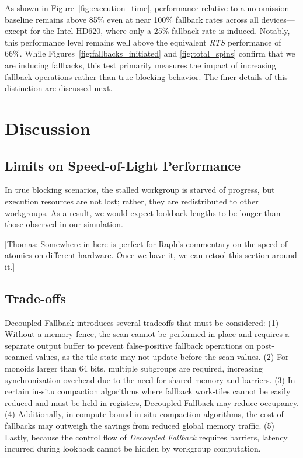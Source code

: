 \documentclass[sigconf]{acmart}
\newcommand{\thomas}[1]{{\footnotesize\color{orange}[Thomas: #1]}}
\begin{document}
As shown in Figure~\ref{fig:execution_time}, performance relative to a no-omission baseline remains above 85\% even at near 100\% fallback rates across all devices---except for the Intel HD620, where only a 25\% fallback rate is induced. Notably, this performance level remains well above the equivalent \emph{RTS} performance of 66\%. While Figures~\ref{fig:fallbacks_initiated} and \ref{fig:total_spins} confirm that we are inducing fallbacks, this test primarily measures the impact of increasing fallback operations rather than true blocking behavior. The finer details of this distinction are discussed next.
\section{Discussion}
\subsection{Limits on Speed-of-Light Performance}

In true blocking scenarios, the stalled workgroup is starved of progress, but execution resources are not lost; rather, they are redistributed to other workgroups. As a result, we would expect lookback lengths to be longer than those observed in our simulation.

\thomas{Somewhere in here is perfect for Raph's commentary on the speed of atomics on different hardware. Once we have it, we can retool this section around it.}

\subsection{Trade-offs}
Decoupled Fallback introduces several tradeoffs that must be considered: (1) Without a memory fence, the scan cannot be performed in place and requires a separate output buffer to prevent false-positive fallback operations on post-scanned values, as the tile state may not update before the scan values. (2) For monoids larger than 64 bits, multiple subgroups are required, increasing synchronization overhead due to the need for shared memory and barriers. (3) In certain in-situ compaction algorithms where fallback work-tiles cannot be easily reduced and must be held in registers, Decoupled Fallback may reduce occupancy. (4) Additionally, in compute-bound in-situ compaction algorithms, the cost of fallbacks may outweigh the savings from reduced global memory traffic. (5) Lastly, because the control flow of \emph{Decoupled Fallback} requires barriers, latency incurred during lookback cannot be hidden by workgroup computation.
\end{document}
